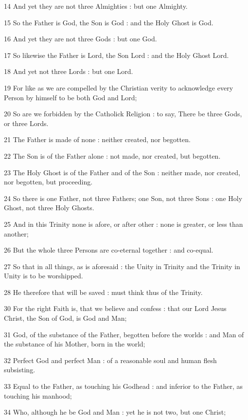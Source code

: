14 And yet they are not three Almighties : but one Almighty.

15 So the Father is God, the Son is God : and the Holy Ghost is God.

16 And yet they are not three Gods : but one God.

17 So likewise the Father is Lord, the Son Lord : and the Holy Ghost Lord.

18 And yet not three Lords : but one Lord.

19 For like as we are compelled by the Christian verity to acknowledge every Person by himself to be both God and Lord;

20 So are we forbidden by the Catholick Religion : to say, There be three Gods, or three Lords.

21 The Father is made of none : neither created, nor begotten.

22 The Son is of the Father alone : not made, nor created, but begotten.

23 The Holy Ghost is of the Father and of the Son : neither made, nor created, nor begotten, but proceeding.

24 So there is one Father, not three Fathers; one Son, not three Sons : one Holy Ghost, not three Holy Ghosts.

25 And in this Trinity none is afore, or after other : none is greater, or less than another;

26 But the whole three Persons are co-eternal together : and co-equal.

27 So that in all things, as is aforesaid : the Unity in Trinity and the Trinity in Unity is to be worshipped.

28 He therefore that will be saved : must think thus of the Trinity.


30 For the right Faith is, that we believe and confess : that our Lord Jesus Christ, the Son of God, is God and Man;

31 God, of the substance of the Father, begotten before the worlds : and Man of the substance of his Mother, born in the world;

32 Perfect God and perfect Man : of a reasonable soul and human flesh subsisting.

33 Equal to the Father, as touching his Godhead : and inferior to the Father, as touching his manhood;

34 Who, although he be God and Man : yet he is not two, but one Christ;

